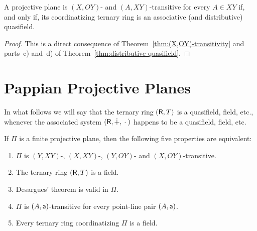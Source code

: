 \begin{thm}
    A projective plane is\/ $(X,OY)$- and\/ $(A,XY)$-transitive for every\/ $A\in XY$ if, and only if, its coordinatizing ternary ring is an associative (and distributive) quasifield.
\end{thm}

\begin{proof}
    This is a direct consequence of Theorem~\ref{thm:(X,OY)-transitivity} and parts~c) and~d) of Theorem~\ref{thm:distributive-quasifield}.
\end{proof}

\section{Pappian Projective Planes}

In what follows we will say that the ternary ring $(\mathsf R,T)$ is a quasifield, field, etc., whenever the associated system $(\mathsf R,\dotplus,{}\cdot{})$ happens to be a quasifield, field, etc.

\begin{thm}\label{thm:finite-desargues-iff-field}
    If\/ $\Pi$ is a finite projective plane, then the following five properties are equivalent:
    \begin{enumerate}[label=\alph*), font=\upshape]
        \item $\Pi$ is\/ $(Y, XY)$-, $(X, XY)$-, $(Y, OY)$- and\/ $(X, OY)$-transitive.
        \item The ternary ring\/ $(\mathsf R,T)$ is a field.
        \item Desargues’ theorem is valid in\/ $\Pi$.
        \item $\Pi$ is\/ $(A,\mathsf a)$-transitive for every point-line pair\/ $(A,\mathsf a)$.
        \item Every ternary ring coordinatizing\/ $\Pi$ is a field.
    \end{enumerate}
\end{thm}

